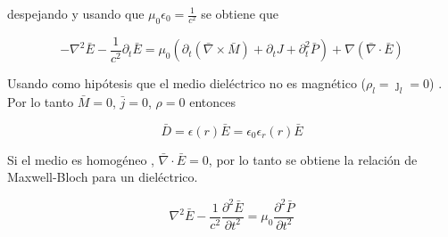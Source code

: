 		despejando y usando que $\mu_0 \epsilon_0 = \tfrac{1}{c^2}$ se obtiene que 
		
		\begin{equation}
		-\nabla^2 \bar{E} - \frac{1}{c^2} \partial_t \bar{E} = \mu_0 (\partial_t (\bar{\nabla} \times \bar{M})+\partial_t J + \partial^{2}_{t} \bar{P}) + \nabla(\bar{\nabla} \cdot \bar{E})  	
		\end{equation}
		
		Usando como hipótesis que el medio dieléctrico no es magnético ($\rho_l=\jmath_l=0$) .
		Por lo tanto  $\bar{M}=0$, $\bar{j}=0$, $\rho=0$ entonces
		
		\[\bar{D}=\epsilon(r)\bar{E}=\epsilon_0 \epsilon_r(r) \bar{E}\]	
		
		Si el medio es homogéneo , $\bar{\nabla}\cdot \bar{E}=0$, por lo tanto se obtiene la relación de Maxwell-Bloch para un dieléctrico.
		
		
		\begin{equation}
		\nabla^2 \bar{E} - \frac{1}{c^2}\frac{\partial^2 \bar{E}}{\partial t^2}= \mu_0 \frac{\partial^2 \bar{P}}{\partial t^2}
		\label{eq: maxwell-bloch}
		\end{equation}
		
		
		
